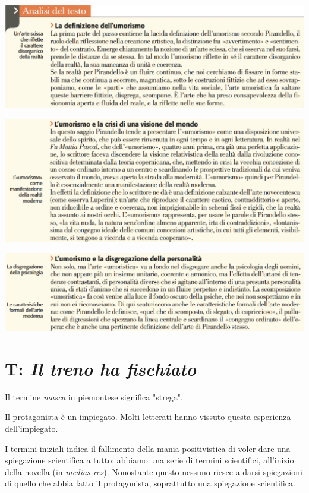 \documentclass[a4paper, twoside, titlepage]{book}
\begin{document}
\begin{center}
\includegraphics[width=\textwidth]{umorismo1}
\end{center}

\begin{center}
\includegraphics[width=\textwidth]{umorismo2}
\end{center}

\begin{center}
\includegraphics[width=\textwidth]{umorismo3}
\end{center}

\chapter{T: \textit{Il treno ha fischiato}}

Il termine \textit{masca} in piemontese significa "strega".

Il protagonista è un impiegato. Molti letterati hanno vissuto questa esperienza dell'impiegato.

I termini iniziali indica il fallimento della mania positivistica di voler dare una spiegazione scientifica a tutto: abbiamo una serie di termini scientifici, all'inizio della novella (in \textit{medias res}).
Nonostante questo nessuno riesce a darsi spiegazioni di quello che abbia fatto il protagonista, soprattutto una spiegazione scientifica.
\end{document}
